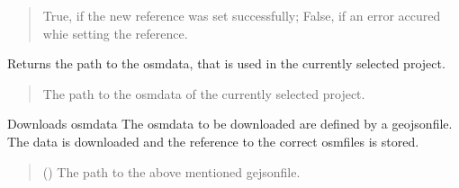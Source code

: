 \documentclass[letterpaper,10pt,english]{sphinxmanual}
\begin{document}
\begin{fulllineitems}
\begin{fulllineitems}
\begin{quote}
\begin{description}
\sphinxAtStartPar
True, if the new reference was set successfully; False, if an error accured whie setting the reference.

\sphinxAtStartPar
{}

\end{description}\end{quote}

\end{fulllineitems}


\begin{fulllineitems}
\label{\detokenize{apidoc/src.osm_configurator.control:src.osm_configurator.control.control_interface.IControl.get_osm_data_reference}}
\pysigstartsignatures
{}
\pysigstopsignatures
\sphinxAtStartPar
Returns the path to the osm\sphinxhyphen{}data, that is used in the currently selected project.
\begin{quote}\begin{description}
\sphinxAtStartPar
The path to the osm\sphinxhyphen{}data of the currently selected project.

\sphinxAtStartPar
{}

\end{description}\end{quote}

\end{fulllineitems}


\begin{fulllineitems}
\label{\detokenize{apidoc/src.osm_configurator.control:src.osm_configurator.control.control_interface.IControl.download_osm_data}}
\pysigstartsignatures
{}
\pysigstopsignatures
\sphinxAtStartPar
Downloads osm\sphinxhyphen{}data
The osm\sphinxhyphen{}data to be downloaded are defined by a geojson\sphinxhyphen{}file. The data is downloaded and the reference to the correct osm\sphinxhyphen{}files is stored.
\begin{quote}\begin{description}
\sphinxAtStartPar
{} () \textendash{} The path to the above mentioned gejson\sphinxhyphen{}file.


\end{description}
\end{quote}
\end{fulllineitems}
\end{fulllineitems}
\end{document}
